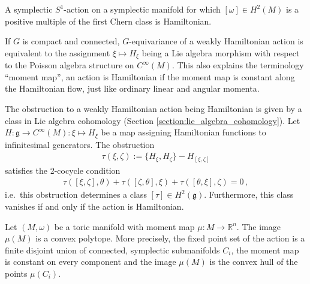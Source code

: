    \begin{property}
        A symplectic $S^1$-action on a symplectic manifold for which $[\omega]\in H^2(M)$ is a positive multiple of the first Chern class is Hamiltonian.
    \end{property}

    \begin{property}[Obstruction]
        If $G$ is compact and connected, $G$-equivariance of a weakly Hamiltonian action is equivalent to the assignment $\xi\mapsto H_\xi$ being a Lie algebra morphism with respect to the Poisson algebra structure on $C^\infty(M)$. This also explains the terminology ``moment map'', an action is Hamiltonian if the moment map is constant along the Hamiltonian flow, just like ordinary linear and angular momenta.

        The obstruction to a weakly Hamiltonian action being Hamiltonian is given by a class in Lie algebra cohomology (Section \ref{section:lie_algebra_cohomology}). Let $H:\mathfrak{g}\rightarrow C^\infty(M):\xi\mapsto H_\xi$ be a map assigning Hamiltonian functions to infinitesimal generators. The obstruction
        \begin{gather}
            \tau(\xi,\zeta) := \{H_\xi,H_\zeta\} - H_{[\xi,\zeta]}
        \end{gather}
        satisfies the 2-cocycle condition
        \begin{gather}
            \tau([\xi,\zeta],\theta) + \tau([\zeta,\theta],\xi) + \tau([\theta,\xi],\zeta) = 0\,,
        \end{gather}
        i.e.~this obstruction determines a class $[\tau]\in H^2(\mathfrak{g})$. Furthermore, this class vanishes if and only if the action is Hamiltonian.
    \end{property}

    \begin{theorem}
        Let $(M,\omega)$ be a toric manifold with moment map $\mu:M\rightarrow\mathbb{R}^n$. The image $\mu(M)$ is a convex polytope. More precisely, the fixed point set of the action is a finite disjoint union of connected, symplectic submanifolds $C_i$, the moment map is constant on every component and the image $\mu(M)$ is the convex hull of the points $\mu(C_i)$.
    \end{theorem}

